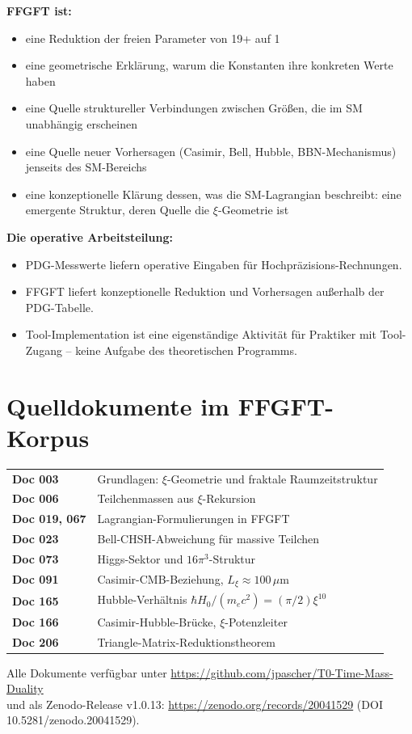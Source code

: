 \documentclass[11pt,a4paper]{article}
\begin{document}
\textbf{FFGFT ist:}
\begin{itemize}\itemsep1pt
\item eine Reduktion der freien Parameter von 19+ auf 1
\item eine geometrische Erklärung, warum die Konstanten ihre konkreten Werte haben
\item eine Quelle struktureller Verbindungen zwischen Größen, die im SM unabhängig erscheinen
\item eine Quelle neuer Vorhersagen (Casimir, Bell, Hubble, BBN-Mechanismus) jenseits des SM-Bereichs
\item eine konzeptionelle Klärung dessen, was die SM-Lagrangian beschreibt: eine emergente Struktur, deren Quelle die $\xi$-Geometrie ist
\end{itemize}

\textbf{Die operative Arbeitsteilung:}
\begin{itemize}\itemsep1pt
\item PDG-Messwerte liefern operative Eingaben für Hochpräzisions-Rechnungen.
\item FFGFT liefert konzeptionelle Reduktion und Vorhersagen außerhalb der PDG-Tabelle.
\item Tool-Implementation ist eine eigenständige Aktivität für Praktiker mit Tool-Zugang -- keine Aufgabe des theoretischen Programms.
\end{itemize}

\section*{Quelldokumente im FFGFT-Korpus}

\noindent\small
\begin{tabular}{ll}
\textbf{Doc 003} & Grundlagen: $\xi$-Geometrie und fraktale Raumzeitstruktur \\
\textbf{Doc 006} & Teilchenmassen aus $\xi$-Rekursion \\
\textbf{Doc 019, 067} & Lagrangian-Formulierungen in FFGFT \\
\textbf{Doc 023} & Bell-CHSH-Abweichung für massive Teilchen \\
\textbf{Doc 073} & Higgs-Sektor und $16\pi^3$-Struktur \\
\textbf{Doc 091} & Casimir-CMB-Beziehung, $L_\xi \approx 100\,\mu$m \\
\textbf{Doc 165} & Hubble-Verhältnis $\hbar H_0/(m_e c^2) = (\pi/2)\xi^{10}$ \\
\textbf{Doc 166} & Casimir-Hubble-Brücke, $\xi$-Potenzleiter \\
\textbf{Doc 206} & Triangle-Matrix-Reduktionstheorem \\
\end{tabular}

\medskip
\noindent\small Alle Dokumente verfügbar unter \url{https://github.com/jpascher/T0-Time-Mass-Duality}\\
und als Zenodo-Release v1.0.13: \url{https://zenodo.org/records/20041529} (DOI 10.5281/zenodo.20041529).
\end{document}
